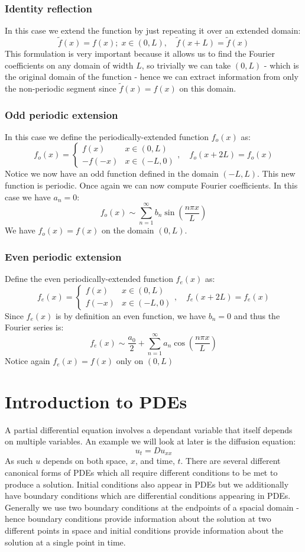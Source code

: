 \documentclass[12pt]{article}
\begin{document}
\subsubsection{Identity reflection}
In this case we extend the function by just repeating it over an extended domain:
\[\tilde{f}(x)=f(x);\; x\in(0,L),\quad \tilde{f}(x+L)=\tilde{f}(x)\]
This formulation is very important because it allows us to find the Fourier coefficients on any domain of width \(L\), so trivially we can take \((0,L)\) - which is the original domain of the function - hence we can extract information from only the non-periodic segment since \(\tilde{f}(x)=f(x)\) on this domain.
\subsubsection{Odd periodic extension}
In this case we define the periodically-extended function \(f_o(x)\) as:
\[f_o(x)=\begin{cases}
    f(x)&x\in(0,L) \\
    -f(-x) & x\in(-L,0)
\end{cases},\quad f_o(x+2L)=f_o(x)\]
Notice we now have an odd function defined in the domain \((-L,L)\). This new function is periodic. Once again we can now compute Fourier coefficients. In this case we have \(a_n=0\):
\[f_o(x)\sim\sum^\infty_{n=1}b_n\sin\left(\frac{n\pi x}{L}\right)\]
We have \(f_o(x)=f(x)\) on the domain \((0,L)\).
\subsubsection{Even periodic extension}
Define the even periodically-extended function \(f_e(x)\) as:
\[f_e(x)=\begin{cases}
    f(x)&x\in(0,L)\\
    f(-x) & x\in(-L,0)
\end{cases},\quad f_e(x+2L)=f_e(x)\]
Since \(f_e(x)\) is by definition an even function, we have \(b_n=0\) and thus the Fourier series is:
\[f_e(x)\sim\frac{a_0}{2}+\sum^\infty_{n=1}a_n\cos\left(\frac{n\pi x}{L}\right)\]
Notice again \(f_e(x)=f(x)\) only on \((0,L)\)
\clearpage
\section{Introduction to PDEs}
A partial differential equation involves a dependant variable that itself depends on multiple variables. An example we will look at later is the diffusion equation:
\[u_{t}=Du_{xx}\]
As such \(u\) depends on both space, \(x\), and time, \(t\). There are several different canonical forms of PDEs which all require different conditions to be met to produce a solution. Initial conditions also appear in PDEs but we additionally have boundary conditions which are differential conditions appearing in PDEs. Generally we use two boundary conditions at the endpoints of a spacial domain - hence boundary conditions provide information about the solution at two different points in space and initial conditions provide information about the solution at a single point in time.
\end{document}

